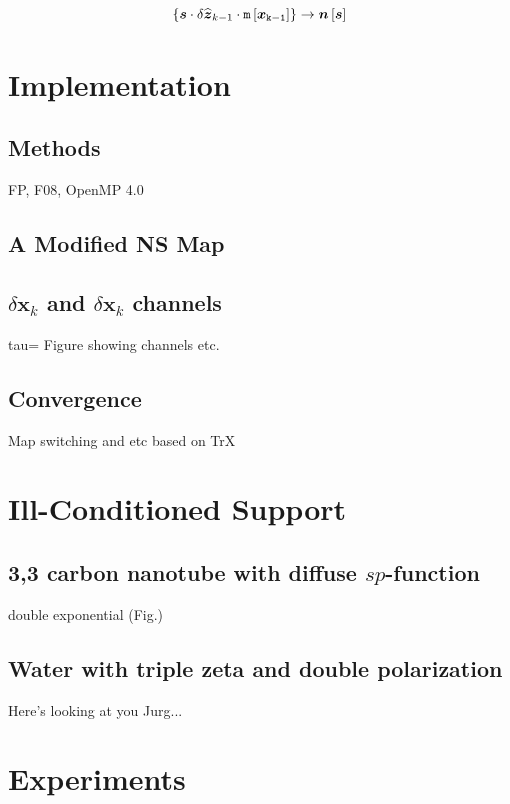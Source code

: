 \documentclass[letterpaper,twocolumn,amsmath,amsfont,amssymb,english,aps,jcp,preprintnumbers,groupaddress,nofootinbib,tightenlines]{revtex4}
\newcommand{\mat}[1]{\boldsymbol{#1}}
\begin{document}



\begin{equation}
\{ \mat{s} \cdot \delta {\widehat{\mat{z}}}_{k-1}
\cdot \tt{m}\left[\mat{x}_{k-1} \right]    \} 
\rightarrow \mat{n}\left[\mat{s} \right]
\end{equation}

\section{Implementation}

\subsection{Methods}
FP, F08, OpenMP 4.0

\subsection{A Modified NS Map}

\subsection{$\delta \mat{x}_k$ and $\delta \mat{x}_k$ channels}
tau= Figure showing channels etc.  

\subsection{Convergence}
Map switching and etc based on TrX


\section{Ill-Conditioned Support}

\subsection{ 3,3 carbon nanotube with diffuse $sp$-function}
double exponential (Fig.)

\subsection{Water with triple zeta and double polarization}
Here's looking at you Jurg...

\section{Experiments}
\end{document}
